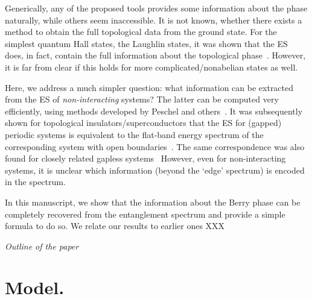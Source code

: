 \documentclass[twocolumn,amsmath,longbibliography,amssymb,superscriptaddress]{revtex4-1}
\begin{document}
Generically, any of the proposed tools provides some information about the phase naturally, while others seem inaccessible. 
It is not known, whether there exists a method to obtain the full topological data from the ground state. 
For the simplest quantum Hall states, the Laughlin states,  it was shown that the ES does, in fact, contain the full information about the topological phase~\cite{hermanns2011haldane}.
However, it is far from clear if this holds for more complicated/nonabelian states as well.  

Here, we address a much simpler question: what information can be extracted from the ES of \emph{non-interacting} systems?
The latter can be computed very efficiently, using methods developed by Peschel and others~\cite{Peschel2003}. 
It was subsequently shown for topological insulators/superconductors that the ES for (gapped) periodic systems is equivalent to the flat-band energy spectrum of the corresponding system with open boundaries~\cite{Fidkowski2010entanglement}. 
The same correspondence was also found for closely related gapless systems~\cite{matern2018entanglement}
However, even for non-interacting systems, it is unclear which information (beyond the  `edge' spectrum) is encoded in the spectrum. 

In this manuscript, we show that the information about the Berry phase can be completely recovered from the entanglement spectrum and provide a simple formula to do so. 
We relate our results to earlier ones XXX

\emph{Outline of the paper}
\section{Model.}
\end{document}

